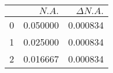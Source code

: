 \begin{tabular}{lrr}
	\toprule
	{} & $N.A.$   & $\Delta N.A.$ \\
	\midrule
	0  & 0.050000 & 0.000834      \\
	1  & 0.025000 & 0.000834      \\
	2  & 0.016667 & 0.000834      \\
	\bottomrule
\end{tabular}
